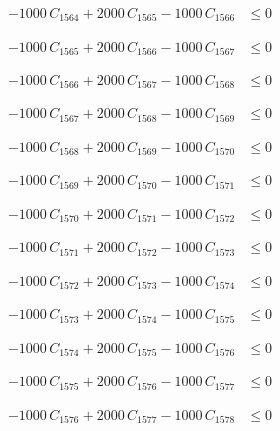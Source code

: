 \documentclass[a4paper,11pt]{article}
\begin{document}
\begin{align}
-1000\,C_{1564} + 2000\,C_{1565} - 1000\,C_{1566} &\leq 0 \nonumber
\end{align}

\begin{align}
-1000\,C_{1565} + 2000\,C_{1566} - 1000\,C_{1567} &\leq 0 \nonumber
\end{align}

\begin{align}
-1000\,C_{1566} + 2000\,C_{1567} - 1000\,C_{1568} &\leq 0 \nonumber
\end{align}

\begin{align}
-1000\,C_{1567} + 2000\,C_{1568} - 1000\,C_{1569} &\leq 0 \nonumber
\end{align}

\begin{align}
-1000\,C_{1568} + 2000\,C_{1569} - 1000\,C_{1570} &\leq 0 \nonumber
\end{align}

\begin{align}
-1000\,C_{1569} + 2000\,C_{1570} - 1000\,C_{1571} &\leq 0 \nonumber
\end{align}

\begin{align}
-1000\,C_{1570} + 2000\,C_{1571} - 1000\,C_{1572} &\leq 0 \nonumber
\end{align}

\begin{align}
-1000\,C_{1571} + 2000\,C_{1572} - 1000\,C_{1573} &\leq 0 \nonumber
\end{align}

\begin{align}
-1000\,C_{1572} + 2000\,C_{1573} - 1000\,C_{1574} &\leq 0 \nonumber
\end{align}

\begin{align}
-1000\,C_{1573} + 2000\,C_{1574} - 1000\,C_{1575} &\leq 0 \nonumber
\end{align}

\begin{align}
-1000\,C_{1574} + 2000\,C_{1575} - 1000\,C_{1576} &\leq 0 \nonumber
\end{align}

\begin{align}
-1000\,C_{1575} + 2000\,C_{1576} - 1000\,C_{1577} &\leq 0 \nonumber
\end{align}

\begin{align}
-1000\,C_{1576} + 2000\,C_{1577} - 1000\,C_{1578} &\leq 0 \nonumber
\end{align}
\end{document}
